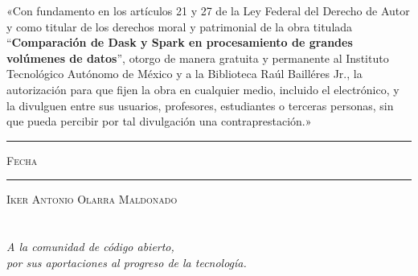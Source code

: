 \documentclass[11pt, oneside]{book}
\begin{document}

\thispagestyle{empty}

\vspace*{\fill}
\begingroup

\noindent
«Con fundamento en los artículos 21 y 27 de la Ley Federal del Derecho de Autor y como titular de los derechos moral y patrimonial de la obra titulada ``\textbf{Comparación de Dask y Spark en procesamiento de grandes volúmenes de datos}'', otorgo de manera gratuita y permanente al Instituto Tecnológico Autónomo de México y a la Biblioteca Raúl Bailléres Jr., la autorización para que fijen la obra en cualquier medio, incluido el electrónico, y la divulguen entre sus usuarios, profesores, estudiantes o terceras personas, sin que pueda percibir por tal divulgación una contraprestación.»


\centering 

\vspace{5em}

\rule[1em]{20em}{0.5pt} %

\textsc{Fecha}
 
\vspace{8em}

\rule[1em]{20em}{0.5pt} %

\textsc{Iker Antonio Olarra Maldonado}

\endgroup
\vspace*{\fill}


\pagestyle{plain}
\frontmatter

\chapter*{}
\begin{flushright}
\textit{A la comunidad de código abierto,\\ por sus aportaciones al progreso de la tecnología.}
\end{flushright}

\end{document}
